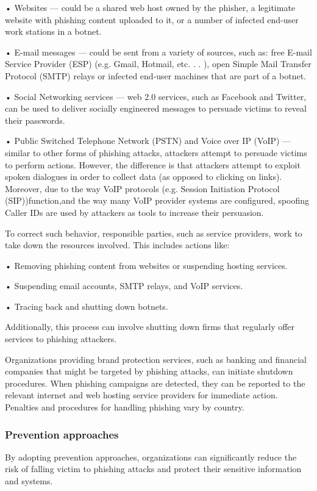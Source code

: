 \documentclass{ijitcs}
\begin{document}
• Websites — could be a shared web host owned by
the phisher, a legitimate website with phishing content
uploaded to it, or a number of infected end-user work stations in a botnet.

• E-mail messages — could be sent from a variety of
sources, such as: free E-mail Service Provider (ESP)
(e.g. Gmail, Hotmail, etc. . . ), open Simple Mail Transfer
Protocol (SMTP) relays or infected end-user machines
that are part of a botnet.

• Social Networking services — web 2.0 services, such
as Facebook and Twitter, can be used to deliver socially
engineered messages to persuade victims to reveal their
passwords.

• Public Switched Telephone Network (PSTN) and Voice
over IP (VoIP) — similar to other forms of phishing
attacks, attackers attempt to persuade victims to perform
actions. However, the difference is that attackers attempt
to exploit spoken dialogues in order to collect data (as
opposed to clicking on links). Moreover, due to the way
VoIP protocols (e.g. Session Initiation Protocol (SIP))function,and the way many VoIP provider systems are
configured, spoofing Caller IDs are used by attackers as
tools to increase their persuasion.

To correct such behavior, responsible parties, such as service providers, work to take down the resources involved. This includes actions like:

• Removing phishing content from websites or suspending hosting services.

• Suspending email accounts, SMTP relays, and VoIP services.

• Tracing back and shutting down botnets.

Additionally, this process can involve shutting down firms that regularly offer services to phishing attackers. 

Organizations providing brand protection services, such as banking and financial companies that might be targeted by phishing attacks, can initiate shutdown procedures. When phishing campaigns are detected, they can be reported to the relevant internet and web hosting service providers for immediate action. Penalties and procedures for handling phishing vary by country.
\subsubsection{Prevention approaches}
By adopting prevention approaches, organizations can significantly reduce the risk of falling victim to phishing attacks and protect their sensitive information and systems.
\end{document}
